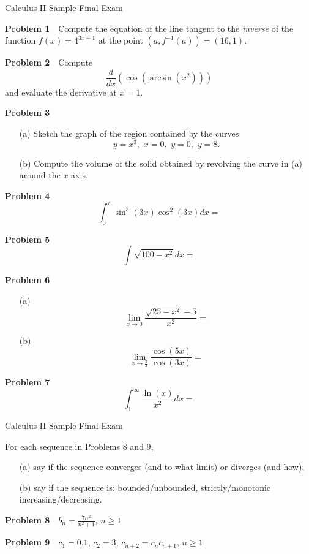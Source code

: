 \documentclass[10pt]{article}
\newcommand{\prob}[1]{\vspace{10mm} \noindent \textbf{Problem #1} \,\,}
\newcommand{\header}{
\begin{center}
Calculus II Sample Final Exam
\end{center}

\vspace{2mm}

}
\newcommand{\intro}{
\noindent There are a total number of 110 points available (100 are needed for a grade of 100\%).

\noindent Show your work and clearly label your answers. \emph{No scrap paper, calculators, or notes are allowed}. 

\noindent To get credit on a problem, you \emph{must} give a \emph{clear, well-written} explanation. An answer alone will not suffice.

\noindent You have 2 hours to complete this test. 
\bigskip

\noindent READ, AND PRINT AND SIGN YOUR NAME BEFORE BEGINNING THE TEST. \\
I will neither give nor receive unauthorized assistance on this test. \\
Printed Name \underline{\hspace{50mm}} \,\,\, Signature \underline{\hspace{50mm}}
}
\begin{document}


\header




\prob{1} %
Compute the equation of the line tangent to the \emph{inverse} of the function $f(x) = 4^{3x-1}$ at the point $(a, f^{-1}(a)) = (16,1)$.

\prob{2} %
Compute \[ \frac{d}{dx} \left( \cos( \arcsin(x^2) ) \right) \] and evaluate the derivative at $x = 1$.

\prob{3} %
\begin{itemize}
\item[(a) ] Sketch the graph of the region contained by the curves 
\[ y = x^3, \,\, x = 0, \,\, y=0, \,\, y = 8. \] 
\item[(b) ] Compute the volume of the solid obtained by revolving the curve in (a) around the $x$-axis.
\end{itemize}

\prob{4} %
\[ \int_0^{\pi} \sin^3(3x) \cos^2(3x) dx =  \]

\prob{5} %
\[ \int \sqrt{100 - x^2} dx =  \]

\prob{6} %
\begin{itemize}
\item[(a) ] 
\[ \lim_{x \to 0} \frac{\sqrt{25-x^2} - 5}{x^2} = \]
\item[(b) ] 
\[ \lim_{x \to \frac{\pi}{2}} \frac{\cos(5x)}{\cos(3x)} = \]
\end{itemize}

\prob{7} %
\[ \int_1^{\infty} \frac{\ln(x)}{x^2} dx = \]

\pagebreak

\header

For each sequence in Problems 8 and 9, 
\begin{itemize}
\item[(a) ] say if the sequence converges (and to what limit) or diverges (and how);
\item[(b) ] say if the sequence is: bounded/unbounded, strictly/monotonic increasing/decreasing.
\end{itemize}

\prob{8} $b_n = \frac{7 n^2}{n^2 + 1}$, $n \geq 1$

\prob{9} $c_1 = 0.1$, $c_2 = 3$, $c_{n+2} = c_n c_{n+1}$, $n \geq 1$
\end{document}
